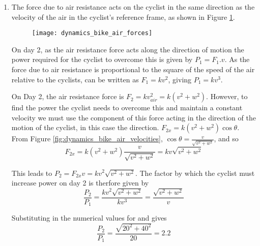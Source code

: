 \begin{problem}
{\begin{enumerate}
On Day 2 the air speed in the cyclists's frame,  is therefore given by $v_{air}^2 = v^2 + w^2$, giving . The angle \vari{\theta} between the direction of motion of the cyclist and the direction of the motion of the air is given by $\tan \theta = \frac{w}{v}$, giving .

\item  The force due to air resistance acts on the cyclist in the same direction as the velocity of the air in the cyclist's reference frame, as shown in Figure \ref{fig:dynamics_bike_air_forces}.

\begin{figure}[h]
\centering
\texttt{[image: dynamics\_bike\_air\_forces]}
\caption{}
\label{fig:dynamics_bike_air_forces}
\end{figure}

On day 2, as the air resistance force acts along the direction of motion the power required for the cyclist to overcome this is given by $P_1 = F_1 . v$. As the force due to air resistance is proportional to the square of the speed of the air relative to the cyclists,  can be written as $F_1 = k v^2$, giving $P_1 = k v^3$.

On Day 2, the air resistance force is $F_2 = k v_{air}^2 = k (v^2 + w^2)$. However, to find the power the cyclist needs to overcome this and maintain a constant velocity we must use the component of this force acting in the direction of the motion of the cyclist, in this case the   direction. $F_{2x} = k (v^2 + w^2) \cos \theta$. From Figure  \ref{fig:dynamics_bike_air_velocities}, $ \cos \theta = \frac{v}{\sqrt{v^2 + w^2}}$, and so 
\begin{equation} F_{2x} = k (v^2 + w^2) \frac{v}{\sqrt{v^2 + w^2}} = kv \sqrt{v^2 + w^2}  \end{equation}

This leads to $P_2 = F_{2x} v = kv^2 \sqrt{v^2 + w^2}$. The factor by which the cyclist must increase power on day 2 is therfore given by
\begin{equation} \frac{P_2}{P_1} = \frac{ kv^2 \sqrt{v^2 + w^2}}{k v^3} = \frac{ \sqrt{v^2 + w^2}}{ v}\end{equation}

Substituting in the numerical values for  and  gives  
\begin{equation}\frac{P_2}{P_1}= \frac{ \sqrt{20^2 + 40^2}}{20} = 2.2\end{equation}

\end{enumerate}
}
\end{problem}
%


